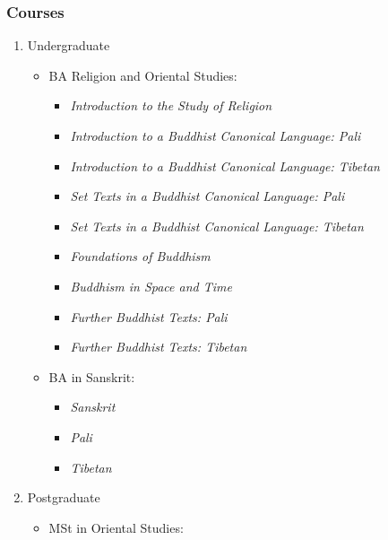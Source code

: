 \documentclass[a4paper,10.5pt]{article}
\begin{document}
\subsubsection{Courses}
\label{sec:org2d8a795}
\begin{enumerate}
\item Undergraduate
\label{sec:org343d1eb}
\begin{itemize}
\item BA Religion and Oriental Studies:\\
\begin{itemize}
\item \emph{Introduction to the Study of Religion}\\
\item \emph{Introduction to a Buddhist Canonical Language: Pali}\\
\item \emph{Introduction to a Buddhist Canonical Language: Tibetan}\\
\item \emph{Set Texts in a Buddhist Canonical Language: Pali}\\
\item \emph{Set Texts in a Buddhist Canonical Language: Tibetan}\\
\item \emph{Foundations of Buddhism}\\
\item \emph{Buddhism in Space and Time}\\
\item \emph{Further Buddhist Texts: Pali}\\
\item \emph{Further Buddhist Texts: Tibetan}\\
\end{itemize}
\item BA in Sanskrit:\\
\begin{itemize}
\item \emph{Sanskrit}\\
\item \emph{Pali}\\
\item \emph{Tibetan}\\
\end{itemize}
\end{itemize}
\item Postgraduate
\label{sec:org337e5d8}
\begin{itemize}
\item MSt in Oriental Studies:\\

\end{itemize}
\end{enumerate}
\end{document}
